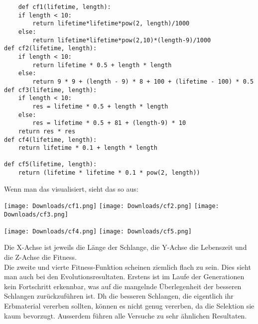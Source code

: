 \documentclass[10pt,a4paper,ngerman,english]{article}
\begin{document}

\begin{addmargin}[2em]{0em}
\begin{lstlisting}
    def cf1(lifetime, length):
    if length < 10:
        return lifetime*lifetime*pow(2, length)/1000
    else:
        return lifetime*lifetime*pow(2,10)*(length-9)/1000
def cf2(lifetime, length):
    if length < 10:
        return lifetime * 0.5 + length * length
    else:
        return 9 * 9 + (length - 9) * 8 + 100 + (lifetime - 100) * 0.5
def cf3(lifetime, length):
    if length < 10:
        res = lifetime * 0.5 + length * length
    else:
        res = lifetime * 0.5 + 81 + (length-9) * 10
    return res * res
def cf4(lifetime, length):
    return lifetime * 0.1 + length * length

def cf5(lifetime, length):
    return (lifetime * lifetime * 0.1 * pow(2, length))
\end{lstlisting}
\end{addmargin}

Wenn man das visualisiert, sieht das so aus:

\begin{center}
    \texttt{[image: Downloads/cf1.png]}
    \texttt{[image: Downloads/cf2.png]}
    \texttt{[image: Downloads/cf3.png]}
\end{center}


\begin{center}
    \texttt{[image: Downloads/cf4.png]}
    \texttt{[image: Downloads/cf5.png]}
\end{center}

Die X-Achse ist jeweils die Länge der Schlange, die Y-Achse die Lebenszeit und die Z-Achse die Fitness.\\

Die zweite und vierte Fitness-Funktion scheinen ziemlich flach zu sein. Dies sieht man auch bei den Evolutionsresultaten. Erstens ist im Laufe der Generationen kein Fortschritt erkennbar, was auf die mangelnde Überlegenheit der besseren Schlangen zurückzuführen ist. Dh die besseren Schlangen, die eigentlich ihr Erbmaterial vererben sollten, können es nicht genug vererben, da die Selektion sie kaum bevorzugt. Ausserdem führen alle Versuche zu sehr ähnlichen Resultaten.\\
\end{document}
